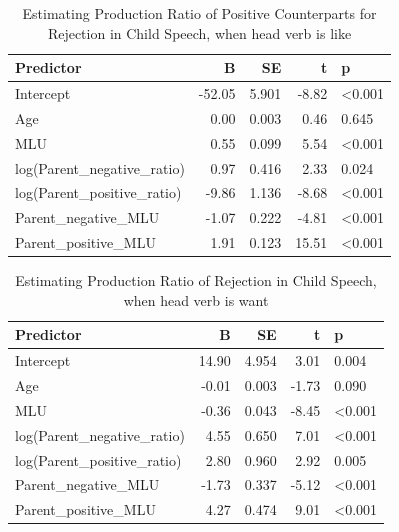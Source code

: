 \documentclass[
  english,
  man,floatsintext]{apa6}
\begin{document}
\begin{table}

\caption{\label{tab:unnamed-chunk-1}Estimating Production Ratio of Positive Counterparts for Rejection in Child Speech, when head verb is like}
\centering
\begin{tabular}[t]{l|r|r|r|l}
\hline
Predictor & B & SE & t & p\\
\hline
Intercept & -52.05 & 5.901 & -8.82 & <0.001\\
\hline
Age & 0.00 & 0.003 & 0.46 & 0.645\\
\hline
MLU & 0.55 & 0.099 & 5.54 & <0.001\\
\hline
log(Parent\_negative\_ratio) & 0.97 & 0.416 & 2.33 & 0.024\\
\hline
log(Parent\_positive\_ratio) & -9.86 & 1.136 & -8.68 & <0.001\\
\hline
Parent\_negative\_MLU & -1.07 & 0.222 & -4.81 & <0.001\\
\hline
Parent\_positive\_MLU & 1.91 & 0.123 & 15.51 & <0.001\\
\hline
\end{tabular}
\end{table}

\clearpage

\begin{table}

\caption{\label{tab:unnamed-chunk-2}Estimating Production Ratio of Rejection in Child Speech, when head verb is want}
\centering
\begin{tabular}[t]{l|r|r|r|l}
\hline
Predictor & B & SE & t & p\\
\hline
Intercept & 14.90 & 4.954 & 3.01 & 0.004\\
\hline
Age & -0.01 & 0.003 & -1.73 & 0.090\\
\hline
MLU & -0.36 & 0.043 & -8.45 & <0.001\\
\hline
log(Parent\_negative\_ratio) & 4.55 & 0.650 & 7.01 & <0.001\\
\hline
log(Parent\_positive\_ratio) & 2.80 & 0.960 & 2.92 & 0.005\\
\hline
Parent\_negative\_MLU & -1.73 & 0.337 & -5.12 & <0.001\\
\hline
Parent\_positive\_MLU & 4.27 & 0.474 & 9.01 & <0.001\\
\hline
\end{tabular}
\end{table}
\end{document}
